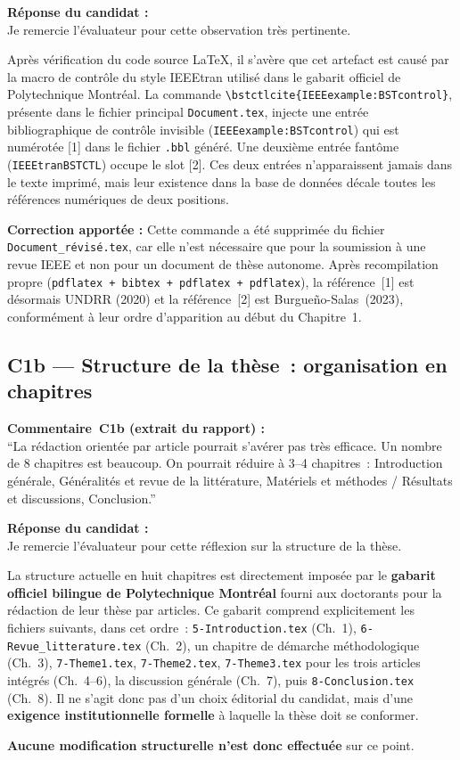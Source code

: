\documentclass[12pt,a4paper]{article}
\newcommand{\Commentaire}[2]{%
  \begin{reviewerbox}
    \textbf{Commentaire~#1 (extrait du rapport) :}\\#2
  \end{reviewerbox}%
}
\newcommand{\Reponse}[1]{%
  \begin{responsebox}
    \textbf{Réponse du candidat :}\\#1
  \end{responsebox}%
}
\begin{document}
\Reponse{
Je remercie l'évaluateur pour cette observation très pertinente.

Après vérification du code source \LaTeX{}, il s'avère que cet artefact est causé par la macro de contrôle du style IEEEtran utilisé dans le gabarit officiel de Polytechnique Montréal. La commande \texttt{\textbackslash bstctlcite\{IEEEexample:BSTcontrol\}}, présente dans le fichier principal \texttt{Document.tex}, injecte une entrée bibliographique de contrôle invisible (\texttt{IEEEexample:BSTcontrol}) qui est numérotée [1] dans le fichier \texttt{.bbl} généré. Une deuxième entrée fantôme (\texttt{IEEEtranBSTCTL}) occupe le slot [2]. Ces deux entrées n'apparaissent jamais dans le texte imprimé, mais leur existence dans la base de données décale toutes les références numériques de deux positions.

\textbf{Correction apportée :} Cette commande a été supprimée du fichier \texttt{Document\_révisé.tex}, car elle n'est nécessaire que pour la soumission à une revue IEEE et non pour un document de thèse autonome. Après recompilation propre (\texttt{pdflatex + bibtex + pdflatex + pdflatex}), la référence~[1] est désormais \textsc{UNDRR} (2020) et la référence~[2] est Burgue\~{n}o-Salas~(2023), conformément à leur ordre d'apparition au début du Chapitre~1.
}

\subsection*{C1b --- Structure de la thèse~: organisation en chapitres}

\Commentaire{C1b}{
  ``La rédaction orientée par article pourrait s'avérer pas très efficace. Un nombre de 8 chapitres
  est beaucoup. On pourrait réduire à 3--4 chapitres~: Introduction générale, Généralités et revue
  de la littérature, Matériels et méthodes / Résultats et discussions, Conclusion.''
}

\Reponse{
Je remercie l'évaluateur pour cette réflexion sur la structure de la thèse.

La structure actuelle en huit chapitres est directement imposée par le \textbf{gabarit officiel bilingue de Polytechnique Montréal} fourni aux doctorants pour la rédaction de leur thèse par articles. Ce gabarit comprend explicitement les fichiers suivants, dans cet ordre~: \texttt{5-Introduction.tex} (Ch.~1), \texttt{6-Revue\_litterature.tex} (Ch.~2), un chapitre de démarche méthodologique (Ch.~3), \texttt{7-Theme1.tex}, \texttt{7-Theme2.tex}, \texttt{7-Theme3.tex} pour les trois articles intégrés (Ch.~4--6), la discussion générale (Ch.~7), puis \texttt{8-Conclusion.tex} (Ch.~8). Il ne s'agit donc pas d'un choix éditorial du candidat, mais d'une \textbf{exigence institutionnelle formelle} à laquelle la thèse doit se conformer.

\textbf{Aucune modification structurelle n'est donc effectuée} sur ce point.
}
\end{document}
